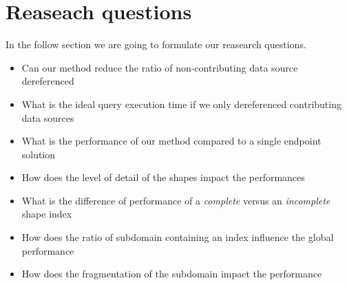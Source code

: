 \section{Reaseach questions}
In the follow section we are going to formulate our reasearch questions.

\cite{Spasi2023}
\begin{itemize}
    \item Can our method reduce the ratio of non-contributing data source dereferenced
    \item What is the ideal query execution time if we only dereferenced contributing data sources
    \item What is the performance of our method compared to a single endpoint solution
    \item How does the level of detail of the shapes impact the performances
    \item What is the difference of performance of a \emph{complete} versus an \emph{incomplete} shape index
    \item How does the ratio of subdomain containing an index influence the global performance
    \item How does the fragmentation of the subdomain impact the performance

\end{itemize}